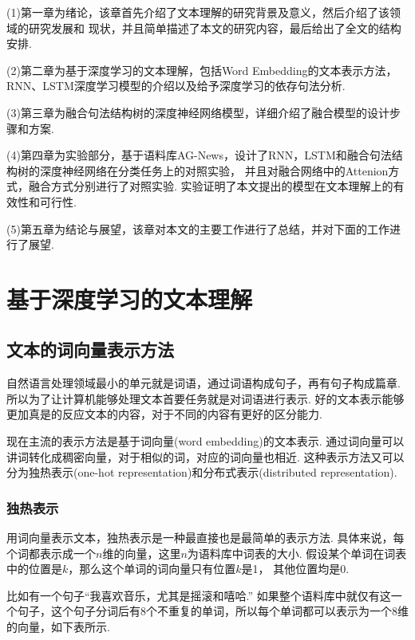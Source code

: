 \documentclass[bachelor,winfonts]{jnuthesis}
\begin{document}
(1)第一章为绪论，该章首先介绍了文本理解的研究背景及意义，然后介绍了该领域的研究发展和 现状，并且简单描述了本文的研究内容，最后给出了全文的结构安排.

(2)第二章为基于深度学习的文本理解，包括Word Embedding的文本表示方法，RNN、LSTM深度学习模型的介绍以及给予深度学习的依存句法分析.

(3)第三章为融合句法结构树的深度神经网络模型，详细介绍了融合模型的设计步骤和方案.

(4)第四章为实验部分，基于语料库AG-News，设计了RNN，LSTM和融合句法结构树的深度神经网络在分类任务上的对照实验，
并且对融合网络中的Attenion方式，融合方式分别进行了对照实验.
实验证明了本文提出的模型在文本理解上的有效性和可行性.

(5)第五章为结论与展望，该章对本文的主要工作进行了总结，并对下面的工作进行了展望.

\chapter{基于深度学习的文本理解}
\section{文本的词向量表示方法}
自然语言处理领域最小的单元就是词语，通过词语构成句子，再有句子构成篇章.
所以为了让计算机能够处理文本首要任务就是对词语进行表示.
好的文本表示能够更加真是的反应文本的内容，对于不同的内容有更好的区分能力.

现在主流的表示方法是基于词向量(word embedding)的文本表示.
通过词向量可以讲词转化成稠密向量，对于相似的词，对应的词向量也相近.
这种表示方法又可以分为独热表示(one-hot representation)和分布式表示(distributed representation).

\subsection{独热表示}
用词向量表示文本，独热表示是一种最直接也是最简单的表示方法.
具体来说，每个词都表示成一个$n$维的向量，这里$n$为语料库中词表的大小.
假设某个单词在词表中的位置是$k$，那么这个单词的词向量只有位置$k$是1，
其他位置均是0.

比如有一个句子“我喜欢音乐，尤其是摇滚和嘻哈.”
如果整个语料库中就仅有这一个句子，这个句子分词后有8个不重复的单词，所以每个单词都可以表示为一个8维的向量，如下表所示.
\end{document}
